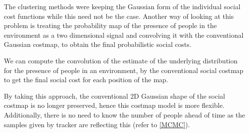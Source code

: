 The clustering methods were keeping the Gaussian form of the individual social cost functions while this need not be the case. Another way of looking at this problem is treating the probability map of the presence of people in the environment as a two dimensional signal and convolving it with the conventional Gaussian costmap, to obtain the final probabilistic social costs. 

We can compute the convolution of the estimate of the underlying distribution for the presence of people in an environment, by the conventional social costmap to get the final social cost for each position of the map.


   
By taking this approach, the conventional 2D Gaussian shape of the social costmap is no longer preserved, hence this costmap model is more flexible. Additionally, there is no need to know the number of people ahead of time as the samples given by tracker are reflecting this (refer to \ref{MCMC}). 
